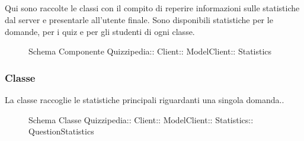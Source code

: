 \subsection{}
Qui sono raccolte le classi con il compito di reperire informazioni sulle statistiche dal server e presentarle all'utente finale. Sono disponibili statistiche per le domande, per i quiz e per gli studenti di ogni classe.
\begin{figure}[H]
\centering
\noindent{}
\caption[Schema Componente Quizzipedia::Client::ModelClient::Statistics]{Schema Componente Quizzipedia:: Client:: ModelClient:: Statistics}
\end{figure}
\subsubsection{Classe }
La classe raccoglie le statistiche principali riguardanti una singola domanda..
\begin{figure}[H]
\centering
\noindent{}
\caption[Schema Classe QuestionStatistics]{Schema Classe Quizzipedia:: Client:: ModelClient:: Statistics:: QuestionStatistics}
\end{figure}
